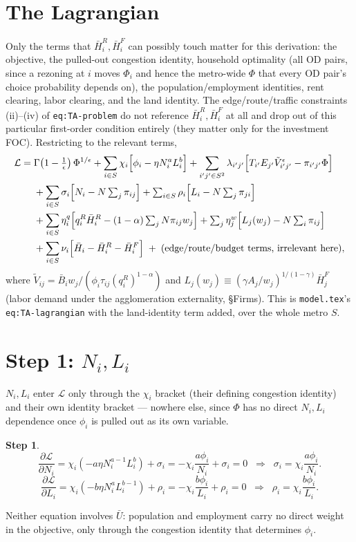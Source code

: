 \documentclass[12pt, a4paper]{article}
\theoremstyle{definition}
\newtheorem{step}{Step}
\begin{document}
\section*{The Lagrangian}

Only the terms that $\bar H_i^R,\bar H_i^F$ can possibly touch matter for this derivation: the objective, the pulled-out congestion identity, household optimality (all OD pairs, since a rezoning at $i$ moves $\Phi_i$ and hence the metro-wide $\Phi$ that every OD pair's choice probability depends on), the population/employment identities, rent clearing, labor clearing, and the land identity. The edge/route/traffic constraints (ii)--(iv) of \texttt{eq:TA-problem} do not reference $\bar H_i^R,\bar H_i^F$ at all and drop out of this particular first-order condition entirely (they matter only for the investment FOC). Restricting to the relevant terms,
\begin{align}
\mathcal L = {}& \Gamma\!\left(1-\tfrac1\epsilon\right)\Phi^{1/\epsilon}
+ \sum_{i\in S}\chi_i\Bigl[\phi_i-\eta N_i^aL_i^b\Bigr]
+ \sum_{i'j'\in S^2}\lambda_{i'j'}\Bigl[T_{i'}E_{j'}\tilde V_{i'j'}^\epsilon - \pi_{i'j'}\Phi\Bigr] \nonumber\\
&+ \sum_{i\in S}\sigma_i\Bigl[N_i - N\textstyle\sum_j\pi_{ij}\Bigr]
+ \sum_{i\in S}\rho_i\Bigl[L_i - N\textstyle\sum_j\pi_{ji}\Bigr] \nonumber\\
&+ \sum_{i\in S}\eta_i^q\Bigl[q_i^R\bar H_i^R - (1-\alpha)\textstyle\sum_jN\pi_{ij}w_j\Bigr]
+ \sum_j\eta_j^w\Bigl[L_j(w_j) - N\textstyle\sum_i\pi_{ij}\Bigr] \nonumber\\
&+ \sum_{i\in S}\nu_i\Bigl[\bar H_i-\bar H_i^R-\bar H_i^F\Bigr] \;+\;(\text{edge/route/budget terms, irrelevant here}), \nonumber
\end{align}
where $\tilde V_{ij}=\bar B_iw_j/(\phi_i\tau_{ij}(q_i^R)^{1-\alpha})$ and $L_j(w_j)\equiv(\gamma A_j/w_j)^{1/(1-\gamma)}\bar H_j^F$ (labor demand under the agglomeration externality, \S Firms). This is \texttt{model.tex}'s \texttt{eq:TA-lagrangian} with the land-identity term added, over the whole metro $S$.

\section*{Step 1: $N_i,L_i$}

$N_i,L_i$ enter $\mathcal L$ only through the $\chi_i$ bracket (their defining congestion identity) and their own identity bracket — nowhere else, since $\Phi$ has no direct $N_i,L_i$ dependence once $\phi_i$ is pulled out as its own variable.
\begin{step}
\[
\frac{\partial\mathcal L}{\partial N_i} = \chi_i\left(-a\eta N_i^{a-1}L_i^b\right) + \sigma_i = -\chi_i\frac{a\phi_i}{N_i}+\sigma_i = 0 \;\;\Longrightarrow\;\; \sigma_i=\chi_i\frac{a\phi_i}{N_i}.
\]
\[
\frac{\partial\mathcal L}{\partial L_i} = \chi_i\left(-b\eta N_i^aL_i^{b-1}\right) + \rho_i = -\chi_i\frac{b\phi_i}{L_i}+\rho_i = 0 \;\;\Longrightarrow\;\; \rho_i=\chi_i\frac{b\phi_i}{L_i}.
\]
\end{step}
Neither equation involves $\bar U$: population and employment carry no direct weight in the objective, only through the congestion identity that determines $\phi_i$.
\end{document}
